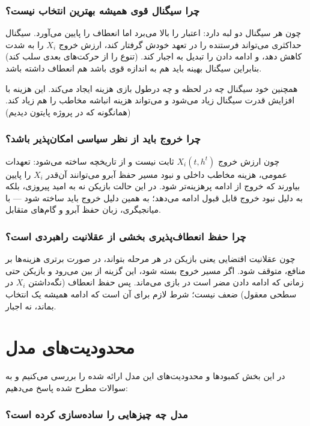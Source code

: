 \documentclass[12pt]{article}
\begin{document}
\subsubsection*{چرا سیگنال قوی همیشه بهترین انتخاب نیست؟}

چون هر سیگنال دو لبه دارد: اعتبار را بالا می‌برد اما انعطاف را پایین می‌آورد.
سیگنال حداکثری می‌تواند فرستنده را در تعهد خودش گرفتار کند،
ارزش خروج $X_i$ 
را به شدت کاهش دهد، و ادامه دادن را تبدیل به اجبار کند. 
(تنوع را از حرکت‌های بعدی سلب کند)
بنابراین سیگنال بهینه باید هم به اندازه قوی باشد هم انعطاف داشته باشد.

همچنین خود سیگنال چه در لحظه و چه درطول بازی هزینه ایجاد می‌کند. این هزینه با افزایش قدرت سیگنال
زیاد می‌شود و می‌تواند هزینه انباشه مخاطب را هم زیاد کند. (همانگونه که در پروژه پایتون دیدیم)

\subsubsection*{چرا خروج باید از نظر سیاسی امکان‌پذیر باشد؟}

چون ارزش خروج $X_i(t,h^t)$ ثابت نیست و از تاریخچه ساخته می‌شود:
تعهدات عمومی، هزینه مخاطب داخلی و نبود مسیر حفظ آبرو
می‌توانند آن‌قدر $X_i$ را پایین بیاورند که خروج از ادامه پرهزینه‌تر شود.
در این حالت بازیکن نه به امید پیروزی، بلکه به دلیل نبود خروج قابل قبول ادامه می‌دهد؛
به همین دلیل خروج باید ساخته شود — با میانجیگری، زبان حفظ آبرو و گام‌های متقابل.

\subsubsection*{چرا حفظ انعطاف‌پذیری بخشی از عقلانیت راهبردی است؟}

چون عقلانیت اقتضایی یعنی بازیکن در هر مرحله بتواند،
در صورت برتری هزینه‌ها بر منافع، متوقف شود.
اگر مسیر خروج بسته شود، این گزینه‌ از بین می‌رود
و بازیکن حتی زمانی که ادامه دادن مضر است در بازی می‌ماند.
پس حفظ انعطاف 
(نگه‌داشتن 
$X_i$
در سطحی معقول)
  ضعف نیست؛
شرط لازم برای آن است که ادامه همیشه یک انتخاب بماند، نه اجبار.


\section{محدودیت‌های مدل}

در این بخش کمبودها و محدودیت‌های این مدل ارائه شده را بررسی می‌کنیم
و به سوالات مطرح شده پاسخ می‌دهیم:

\subsubsection*{مدل چه چیزهایی را ساده‌سازی کرده است؟}
\end{document}
